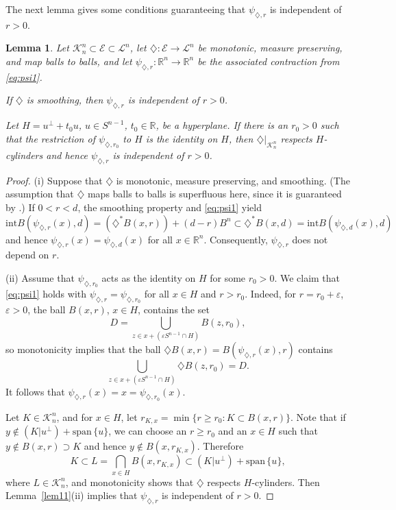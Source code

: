\documentclass[12pt,reqno]{amsart}
\newcommand{\R}{{\mathbb R}}
\newcommand{\cK}{\mathcal K}
\newcommand{\cL}{\mathcal L}
\newcommand{\cE}{{\mathcal E}}
\newtheorem{lem}[thm]{Lemma}
\newcommand{\myspan}{{\mathrm{span}}\,}
\newcommand{\di}{\diamondsuit}
\numberwithin{equation}{section}
\begin{document}
The next lemma gives some conditions guaranteeing that $\psi_{\di,r}$ is independent of $r>0$.

\begin{lem}\label{lem11_inependent}
Let ${\mathcal{K}}^n_n\subset{\mathcal{E}}\subset {\mathcal{L}}^n$, let $\di:\cE\to\cL^n$ be monotonic, measure preserving, and map balls to balls, and let $\psi_{\di,r}:\R^n\to\R^n$ be the associated contraction from \eqref{eq:psi1}.

 If $\di$ is smoothing, then $\psi_{\di,r}$  is independent of $r>0$.

 Let $H=u^\perp+t_0u$, $u\in S^{n-1}$, $t_0\in\R$, be a hyperplane. If there is an $r_0>0$ such that the restriction of $\psi_{\di,r_0}$ to $H$ is the identity on $H$, then $\di\big|_{\cK_n^n}$ respects $H$-cylinders and hence $\psi_{\di,r}$ is independent of $r>0$.
\end{lem}

\begin{proof}
(i) Suppose that $\di$ is monotonic, measure preserving, and smoothing.  (The assumption that $\di$ maps balls to balls is superfluous here, since it is guaranteed by \cite[Lemma~4.1]{BGGK2}.) If  $0<r<d$, the smoothing property and \eqref{eq:psi1} yield
$$
\mathrm{int} B(\psi_{\di,r}(x),d)=(\di^* B(x,r))+(d-r)B^n\subset \di^* B(x,d)=\mathrm{int} B(\psi_{\di,d}(x),d)
$$
and hence $\psi_{\di,r}(x)=\psi_{\di,d}(x)$ for all $x\in \R^n$.  Consequently, $\psi_{\di,r}$ does not depend on $r$.

(ii) Assume that $\psi_{\di,r_0}$ acts as the identity on $H$ for some $r_0>0$. We claim that \eqref{eq:psi1} holds with  $\psi_{\di,r}=\psi_{\di,r_0}$ for all $x\in H$ and $r>r_0$.
Indeed, for $r=r_0+\varepsilon$, $\varepsilon>0$, the ball $B(x,r)$, $x\in H$, contains the set
$$D=\bigcup_{z\in x+(
\varepsilon S^{n-1}\cap H)} B(z,r_0),$$
so monotonicity implies that
the ball $\di B(x,r)= B(\psi_{\di,r}(x),r)$ contains
\[
\bigcup_{z\in x+(\varepsilon S^{n-1}\cap H)}\di B(z,r_0)=D.
\]
It follows that $\psi_{\di,r}(x)=x=\psi_{\di,r_0}(x)$.

Let $K\in \cK_n^n$, and for $x\in H$, let $r_{K,x}=\min\{r\ge r_0: K\subset B(x,r)\}$.  Note that if $y\not\in (K|u^\perp)+\myspan\{u\}$, we can choose an $r\ge r_0$ and an $x\in H$ such that $y\not\in B(x,r)\supset K$ and hence $y\not\in B(x,r_{K,x})$.  Therefore
$$K\subset L= \bigcap_{x\in H} B(x,r_{K,x})\subset(K|u^\perp)+\myspan\{u\},$$
where $L\in \cK_n^n$, and monotonicity shows that $\di$ respects $H$-cylinders.  Then Lemma~\ref{lem11}(ii) implies that $\psi_{\di,r}$ is independent of $r>0$.
\end{proof}
\end{document}
